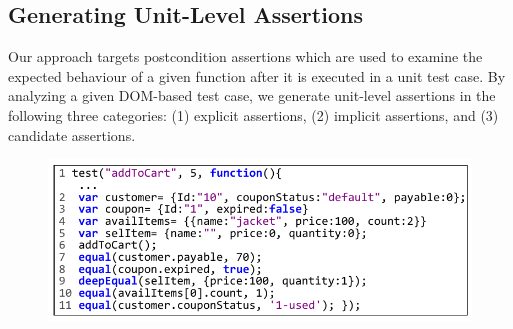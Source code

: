 \subsection{Generating Unit-Level Assertions} \label{Sec:unitLevelAssertion}
Our approach targets postcondition assertions which are used to examine the expected behaviour of a given function after it is executed in a unit test case.
By analyzing a given DOM-based test case, we generate unit-level assertions in the following three categories: (1) explicit assertions, (2) implicit assertions, and (3) candidate assertions.
\begin{figure}
  \centering
  \includegraphics[width=1\hsize]{fig/unitTest}
   \vspace{-0.3in} 
  \label{Fig:unitTest}
  \vspace{-0.2in} 
\end{figure} 
 



 